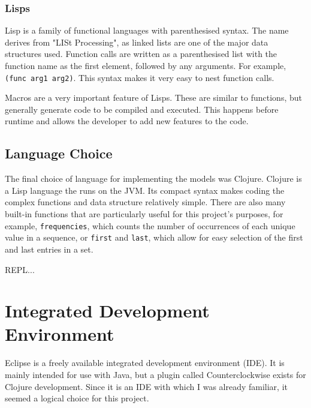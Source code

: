 
\subsubsection{Lisps}

Lisp is a family of functional languages with parenthesised syntax. The name derives from "LISt Processing", as linked lists are one of the major data structures used. Function calls are written as a parenthesised list with the function name as the first element, followed by any arguments. For example, \lstinline!(func arg1 arg2)!. This syntax makes it very easy to nest function calls.

Macros are a very important feature of Lisps. These are similar to functions, but generally generate code to be compiled and executed. This happens before runtime and allows the developer to add new features to the code.


\subsection{Language Choice}

The final choice of language for implementing the models was Clojure. Clojure is a Lisp language the runs on the JVM. Its compact syntax makes coding the complex functions and data structure relatively simple. There are also many  built-in functions that are particularly useful for this project's purposes, for example, \lstinline!frequencies!, which counts the number of occurrences of each unique value in a sequence, or \lstinline!first! and \lstinline!last!, which allow for easy selection of the first and last entries in a set.

REPL...



\section{Integrated Development Environment}

Eclipse is a freely available integrated development environment (IDE). It is mainly intended for use with Java, but a plugin called Counterclockwise exists for Clojure development. Since it is an IDE with which I was already familiar, it seemed a logical choice for this project. 

